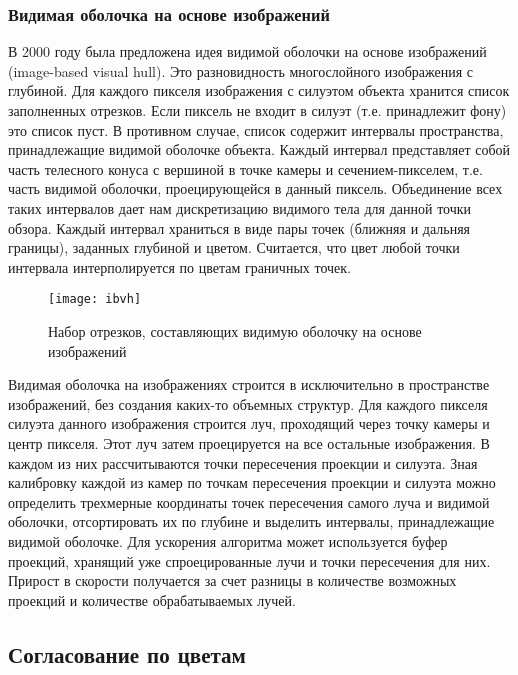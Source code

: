 \subsubsection{Видимая оболочка на основе изображений}
В 2000 году была предложена идея видимой оболочки на основе изображений (image-based visual hull). Это разновидность многослойного изображения с глубиной. Для каждого пикселя изображения с силуэтом объекта хранится список заполненных отрезков. Если пиксель не входит в силуэт (т.е. принадлежит фону) это список пуст. В противном случае, список содержит интервалы пространства, принадлежащие видимой оболочке объекта. Каждый интервал представляет собой часть телесного конуса с вершиной в точке камеры и сечением-пикселем, т.е. часть видимой оболочки, проецирующейся в данный пиксель. Объединение всех таких интервалов дает нам дискретизацию видимого тела для данной точки обзора. Каждый интервал храниться в виде пары точек (ближняя и дальняя границы), заданных глубиной и цветом. Считается, что цвет любой точки интервала интерполируется по цветам граничных точек.
\begin{figure}[h]
\center
\texttt{[image: ibvh]}
\caption{Набор отрезков, составляющих видимую оболочку на основе изображений}
\end{figure}

Видимая оболочка на изображениях строится в исключительно в пространстве изображений, без создания каких-то объемных структур. Для каждого пикселя силуэта данного изображения строится луч, проходящий через точку камеры и центр пикселя. Этот луч затем проецируется на все остальные изображения. В каждом из них рассчитываются точки пересечения проекции и силуэта. Зная калибровку каждой из камер по точкам пересечения проекции и силуэта можно определить трехмерные координаты точек пересечения самого луча и видимой оболочки, отсортировать их по глубине и выделить интервалы, принадлежащие видимой оболочке. Для ускорения алгоритма может используется буфер проекций, хранящий уже спроецированные лучи и точки пересечения для них. Прирост в скорости получается за счет разницы в количестве возможных проекций и количестве обрабатываемых лучей.

\subsection{Согласование по цветам}
